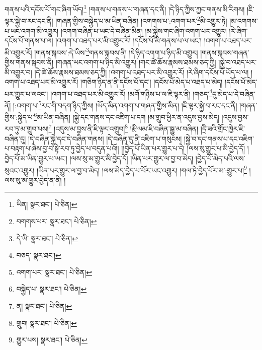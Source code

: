 གནས་པའི་དངོས་པོ་གང་ཞིག་ཡོད།\footnote{ཡིན།  སྣར་ཐང་།  པེ་ཅིན། } །གནས་པ་གནས་པ་གཞན་དང་ནི། །དེ་ཉིད་ཀྱིས་ཀྱང་གནས་མི་རིགས། །ཇི་ལྟར་སྐྱེ་བ་རང་དང་ནི། །གཞན་གྱིས་བསྐྱེད་པ་མ་ཡིན་བཞིན། །འགགས་པ་:འགག་པར་\footnote{བགགས་པར་  སྣར་ཐང་།  པེ་ཅིན། }མི་འགྱུར་ཏེ། །མ་འགགས་པ་ཡང་འགག་མི་འགྱུར། །འགག་བཞིན་པ་ཡང་དེ་བཞིན་མིན། །མ་སྐྱེས་གང་ཞིག་འགག་པར་འགྱུར། །རེ་ཞིག་དངོས་པོ་གནས་པ་ལ། །འགག་པ་འཐད་པར་མི་འགྱུར་རོ། །དངོས་པོ་མི་གནས་པ་ལ་ཡང་། །འགག་པ་འཐད་པར་མི་འགྱུར་རོ། །གནས་སྐབས་:དེ་ཡིས་\footnote{དེ་ཡི་  སྣར་ཐང་།  པེ་ཅིན། }གནས་སྐབས་ནི། །དེ་ཉིད་འགག་པ་ཉིད་མི་འགྱུར། །གནས་སྐབས་གཞན་གྱིས་གནས་སྐབས་ནི། །གཞན་ཡང་འགག་པ་ཉིད་མི་འགྱུར། །གང་ཚེ་ཆོས་རྣམས་ཐམས་ཅད་ཀྱི། །སྐྱེ་བ་འཐད་པར་མི་འགྱུར་བ། །དེ་ཚེ་ཆོས་རྣམས་ཐམས་ཅད་ཀྱི། །འགག་པ་འཐད་པར་མི་འགྱུར་རོ། །རེ་ཞིག་དངོས་པོ་ཡོད་པ་ལ། །འགག་པ་འཐད་པར་མི་འགྱུར་རོ། །གཅིག་ཉིད་ན་ནི་དངོས་པོ་དང་། །དངོས་པོ་མེད་པ་འཐད་པ་མེད། །དངོས་པོ་མེད་པར་གྱུར་པ་ལའང་། །འགག་པ་འཐད་པར་མི་འགྱུར་རོ། །མགོ་གཉིས་པ་ལ་ཇི་ལྟར་ནི། །གཅད་\footnote{བཅད་  སྣར་ཐང་། }དུ་མེད་པ་དེ་བཞིན་ནོ། །:འགག་པ་\footnote{འགག་པར་  སྣར་ཐང་།  པེ་ཅིན། }རང་གི་བདག་ཉིད་ཀྱིས། །ཡོད་མིན་འགག་པ་གཞན་གྱིས་མིན། །ཇི་ལྟར་སྐྱེ་བ་རང་དང་ནི། །གཞན་གྱིས་:སྐྱེད་པ་\footnote{བསྐྱེད་པ་  སྣར་ཐང་།  པེ་ཅིན། }མ་ཡིན་བཞིན། །སྐྱེ་དང་གནས་དང་འཇིག་པ་དག །མ་གྲུབ་ཕྱིར་ན་འདུས་བྱས་མེད། །འདུས་བྱས་རབ་ཏུ་མ་གྲུབ་པས།\footnote{ན།  སྣར་ཐང་།  པེ་ཅིན། } །འདུས་མ་བྱས་ནི་ཇི་ལྟར་འགྲུབ།\footnote{གྲུབ།  སྣར་ཐང་།  པེ་ཅིན། } །རྨི་ལམ་ཇི་བཞིན་སྒྱུ་མ་བཞིན། །དྲི་ཟའི་གྲོང་ཁྱེར་ཇི་བཞིན་དུ། །དེ་བཞིན་སྐྱེ་དང་དེ་བཞིན་གནས། །དེ་བཞིན་དུ་ནི་འཇིག་པ་གསུངས། །སྐྱེ་བ་དང་གནས་པ་དང་འཇིག་པ་བརྟག་པ་ཞེས་བྱ་བ་སྟེ་རབ་ཏུ་བྱེད་པ་བདུན་པའོ།། །།བྱེད་པོ་ཡིན་པར་གྱུར་པ་དེ། །ལས་སུ་གྱུར་པ་མི་བྱེད་དོ། །བྱེད་པོ་མ་ཡིན་གྱུར་པ་ཡང་། །ལས་སུ་མ་གྱུར་མི་བྱེད་དོ། །ཡིན་པར་གྱུར་ལ་བྱ་བ་མེད། །བྱེད་པོ་མེད་པའི་ལས་སུའང་འགྱུར། །ཡིན་པར་གྱུར་ལ་བྱ་བ་མེད། །ལས་མེད་བྱེད་པ་པོར་ཡང་འགྱུར། །གལ་ཏེ་བྱེད་པོར་མ་:གྱུར་པ།\footnote{གྱུར་པས།  སྣར་ཐང་།  པེ་ཅིན། } །ལས་སུ་མ་གྱུར་བྱེད་ན་ནི། །
